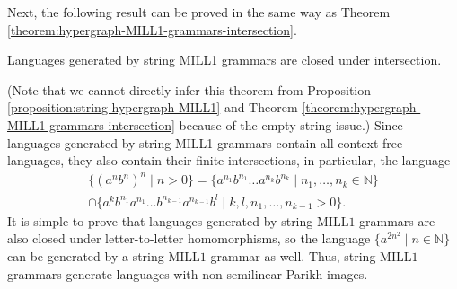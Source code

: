 \documentclass[a4paper,UKenglish,cleveref, autoref, thm-restate,pdfa]{lipics-v2021}
\newcommand{\Nat}{\mathbb{N}}
\newcommand{\MILLFO}{\mathrm{MILL}1}
\begin{document}
Next, the following result can be proved in the same way as Theorem \ref{theorem:hypergraph-MILL1-grammars-intersection}.
\begin{theorem}
	Languages generated by string MILL1 grammars are closed under intersection.
\end{theorem}
(Note that we cannot directly infer this theorem from Proposition \ref{proposition:string-hypergraph-MILL1} and Theorem \ref{theorem:hypergraph-MILL1-grammars-intersection} because of the empty string issue.)
Since languages generated by string MILL1 grammars contain all context-free languages, they also contain their finite intersections, in particular, the language 
\begin{multline*}
	\{(a^nb^n)^n \mid n > 0 \} = \{a^{n_1}b^{n_1}\ldots a^{n_k}b^{n_k} \mid n_1,\ldots,n_k \in \Nat\} \\ \cap \{a^{k}b^{n_1}a^{n_1}\ldots b^{n_{k-1}} a^{n_{k-1}} b^l \mid k,l,n_1,\ldots,n_{k-1} >0 \}.
\end{multline*}
It is simple to prove that languages generated by string $\MILLFO$ grammars are also closed under letter-to-letter homomorphisms, so the language $\{a^{2n^2} \mid n \in \Nat\}$ can be generated by a string $\MILLFO$ grammar as well. Thus, string $\MILLFO$ grammars generate languages with non-semilinear Parikh images.
\end{document}

